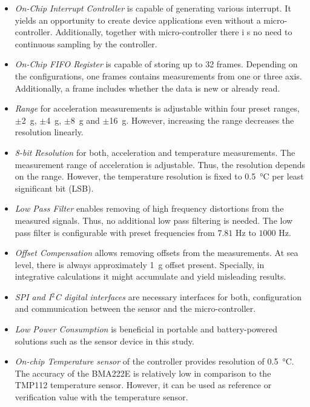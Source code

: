 \documentclass[english,12pt,a4paper,pdftex,elec,utf8]{aaltothesis}
\begin{document}
\begin{itemize}
\item \textit{On-Chip Interrupt Controller} is capable of generating various interrupt. It yields an opportunity to create device applications even without a micro-controller. Additionally, together with micro-controller there i s no need to continuous sampling by the controller.

\item \textit{On-Chip FIFO Register} is capable of storing up to 32 frames. Depending on the configurations, one frames contains measurements from one or three axis. Additionally, a frame includes whether the data is new or already read.

\item \textit{Range} for acceleration measurements is adjustable within four preset ranges,  $\pm$\SI{2}{\gram}, $\pm$\SI{4}{\gram}, $\pm$\SI{8}{\gram} and $\pm$\SI{16}{\gram}. However, increasing the range decreases the resolution linearly.

\item \textit{8-bit Resolution} for both, acceleration and temperature measurements. The measurement range of acceleration is adjustable. Thus, the resolution depends on the range.  However, the temperature resolution is fixed to \SI{0.5}{\celsius} per least significant bit (LSB).

\item \textit{Low Pass Filter} enables removing of high frequency distortions from the measured signals. Thus, no additional low pass filtering is needed.  The low pass filter is configurable with preset frequencies from $7.81$ Hz to $1000$ Hz.

\item \textit{Offset Compensation} allows removing offsets from the measurements. At sea level, there is always approximately \SI{1}{\gram} offset present. Specially, in integrative calculations it might accumulate and yield misleading results.


\item \textit{SPI and I$^2$C digital interfaces} are necessary interfaces for both, configuration and communication between the sensor and the micro-controller.

\item \textit{Low Power Consumption} is beneficial in portable and battery-powered solutions such as the sensor device in this study.
 
\item \textit{On-chip Temperature sensor} of the controller provides resolution of \SI{0.5}{\celsius}. The accuracy of the BMA222E is relatively low in comparison to the TMP112 temperature sensor. However, it can be used as reference or verification value with the temperature sensor. \cite{bma222datasheet}

\end{itemize}
\end{document}
